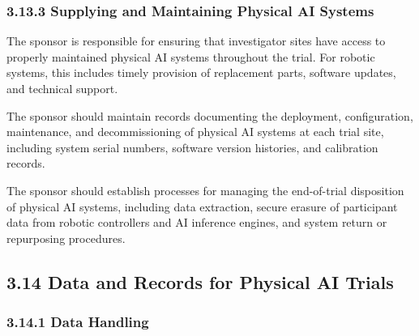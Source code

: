 \subsubsection{3.13.3 Supplying and Maintaining Physical AI Systems}

\begin{description}[leftmargin=2.5cm,style=sameline]

\item[(a)] The sponsor is responsible for ensuring that investigator sites have access to properly maintained physical AI systems throughout the trial. For robotic systems, this includes timely provision of replacement parts, software updates, and technical support.

\item[(b)] The sponsor should maintain records documenting the deployment, configuration, maintenance, and decommissioning of physical AI systems at each trial site, including system serial numbers, software version histories, and calibration records.

\item[(c)] The sponsor should establish processes for managing the end-of-trial disposition of physical AI systems, including data extraction, secure erasure of participant data from robotic controllers and AI inference engines, and system return or repurposing procedures.

\end{description}

\subsection{3.14 Data and Records for Physical AI Trials}

\subsubsection{3.14.1 Data Handling}

